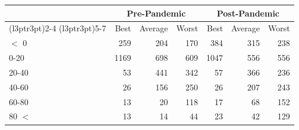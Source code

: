 
\begin{tabular}[t]{lrrrrrr}
\toprule
\multicolumn{1}{c}{ } & \multicolumn{3}{c}{Pre-Pandemic} & \multicolumn{3}{c}{Post-Pandemic} \\
\cmidrule(l{3pt}r{3pt}){2-4} \cmidrule(l{3pt}r{3pt}){5-7}
 & Best & Average & Worst & Best & Average & Worst\\
\midrule
$<$ 0 & 259 & 204 & 170 & 384 & 315 & 238\\
0-20 & 1169 & 698 & 609 & 1047 & 556 & 556\\
20-40 & 53 & 441 & 342 & 57 & 366 & 236\\
40-60 & 26 & 156 & 250 & 26 & 207 & 243\\
60-80 & 13 & 20 & 118 & 17 & 68 & 152\\
80 $<$ & 13 & 14 & 44 & 23 & 42 & 129\\
\bottomrule
\end{tabular}
